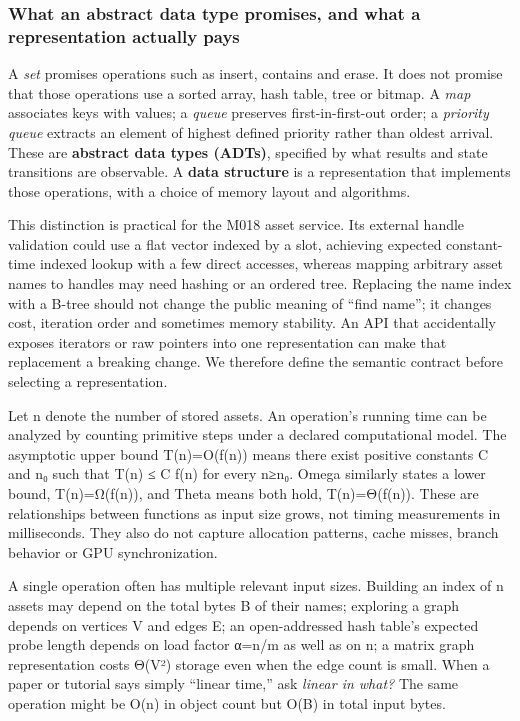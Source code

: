 \subsubsection{What an abstract data type promises, and what a representation actually pays}\label{what-an-abstract-data-type-promises-and-what-a-representation-actually-pays}

A \emph{set} promises operations such as insert, contains and erase. It does not promise that those operations use a sorted array, hash table, tree or bitmap. A \emph{map} associates keys with values; a \emph{queue} preserves first-in-first-out order; a \emph{priority queue} extracts an element of highest defined priority rather than oldest arrival. These are \textbf{abstract data types (ADTs)}, specified by what results and state transitions are observable. A \textbf{data structure} is a representation that implements those operations, with a choice of memory layout and algorithms.

This distinction is practical for the M018 asset service. Its external handle validation could use a flat vector indexed by a slot, achieving expected constant-time indexed lookup with a few direct accesses, whereas mapping arbitrary asset names to handles may need hashing or an ordered tree. Replacing the name index with a B-tree should not change the public meaning of ``find name''; it changes cost, iteration order and sometimes memory stability. An API that accidentally exposes iterators or raw pointers into one representation can make that replacement a breaking change. We therefore define the semantic contract before selecting a representation.

Let n denote the number of stored assets. An operation's running time can be analyzed by counting primitive steps under a declared computational model. The asymptotic upper bound T(n)=O(f(n)) means there exist positive constants C and n₀ such that T(n) ≤ C f(n) for every n≥n₀. Omega similarly states a lower bound, T(n)=Ω(f(n)), and Theta means both hold, T(n)=Θ(f(n)). These are relationships between functions as input size grows, not timing measurements in milliseconds. They also do not capture allocation patterns, cache misses, branch behavior or GPU synchronization.

A single operation often has multiple relevant input sizes. Building an index of n assets may depend on the total bytes B of their names; exploring a graph depends on vertices V and edges E; an open-addressed hash table's expected probe length depends on load factor α=n/m as well as on n; a matrix graph representation costs Θ(V²) storage even when the edge count is small. When a paper or tutorial says simply ``linear time,'' ask \emph{linear in what?} The same operation might be O(n) in object count but O(B) in total input bytes.

